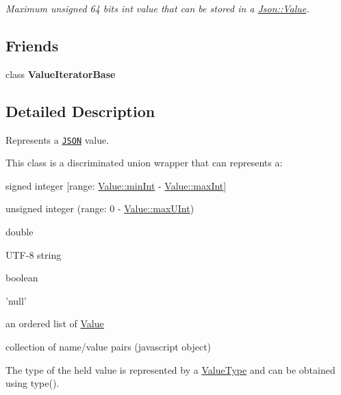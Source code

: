 \begin{DoxyCompactItemize}
\begin{DoxyCompactList}\small\item\em Maximum unsigned 64 bits int value that can be stored in a \hyperlink{class_json_1_1_value}{Json\-::\-Value}. \end{DoxyCompactList}\end{DoxyCompactItemize}
\subsection*{Friends}
\begin{DoxyCompactItemize}
\item 
\hypertarget{class_json_1_1_value_ad016df56489e5d360735457afba2f649}{class {\bfseries Value\-Iterator\-Base}}\label{class_json_1_1_value_ad016df56489e5d360735457afba2f649}

\end{DoxyCompactItemize}


\subsection{Detailed Description}
Represents a \href{http://www.json.org}{\tt J\-S\-O\-N} value. 

This class is a discriminated union wrapper that can represents a\-:
\begin{DoxyItemize}
\item signed integer \mbox{[}range\-: \hyperlink{class_json_1_1_value_a7df8a39e2502b8c92a6a41e3d752d2c8}{Value\-::min\-Int} -\/ \hyperlink{class_json_1_1_value_a978c799a8af3114ef7dab6fd0a310a1b}{Value\-::max\-Int}\mbox{]}
\item unsigned integer (range\-: 0 -\/ \hyperlink{class_json_1_1_value_ac79e63ee68d3aa914bfd6988be669b87}{Value\-::max\-U\-Int})
\item double
\item U\-T\-F-\/8 string
\item boolean
\item 'null'
\item an ordered list of \hyperlink{class_json_1_1_value}{Value}
\item collection of name/value pairs (javascript object)
\end{DoxyItemize}

The type of the held value is represented by a \hyperlink{namespace_json_a7d654b75c16a57007925868e38212b4e}{Value\-Type} and can be obtained using type().

